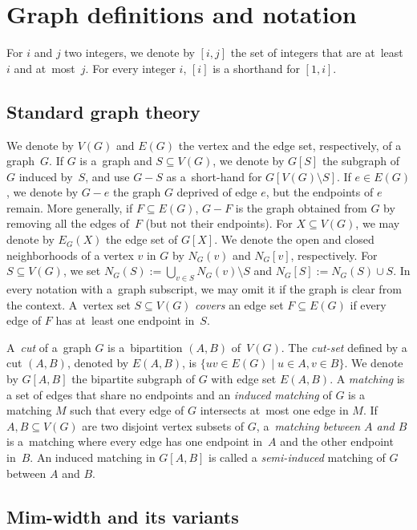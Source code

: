 \documentclass[a4paper,UKenglish,cleveref,hyperref,autoref]{lipics-v2021}
\begin{document}
\section{Graph definitions and notation}

For $i$ and $j$ two integers, we denote by $[i,j]$ the set of integers that are at~least~$i$ and at~most~$j$.
For every integer $i$, $[i]$ is a shorthand for $[1,i]$.

\subsection{Standard graph theory}


We denote by $V(G)$ and $E(G)$ the vertex and the edge set, respectively, of a graph~$G$.
If $G$ is a~graph and $S \subseteq V(G)$, we denote by $G[S]$ the subgraph of $G$ induced by~$S$, and use $G-S$ as a~short-hand for $G[V(G) \setminus S]$.
If $e \in E(G)$, we denote by $G-e$ the graph $G$ deprived of edge $e$, but the endpoints of $e$ remain.
More generally, if $F \subseteq E(G)$, $G-F$ is the graph obtained from $G$ by removing all the edges of~$F$ (but not their endpoints).
For $X \subseteq V(G)$, we may denote by $E_G(X)$ the edge set of $G[X]$.
We denote the open and closed neighborhoods of a vertex $v$ in $G$ by $N_G(v)$ and $N_G[v]$, respectively.
For $S \subseteq V(G)$, we set $N_G(S) := \bigcup_{v \in S}N_G(v) \setminus S$ and $N_G[S] := N_G(S) \cup S$.
In every notation with a~graph subscript, we may omit it if the graph is clear from the context.
A~vertex set $S \subseteq V(G)$ \emph{covers} an edge set $F \subseteq E(G)$ if every edge of $F$ has at~least one endpoint in~$S$. 

A~\emph{cut} of a~graph $G$ is a~bipartition $(A,B)$ of~$V(G)$.
The \emph{cut-set} defined by a cut $(A,B)$, denoted by $E(A,B)$, is $\{uv\in E(G)\mid u\in A, v\in B\}$.
We denote by $G[A,B]$ the bipartite subgraph of $G$ with edge set $E(A,B)$.
A \emph{matching} is a set of edges that share no endpoints
and an \emph{induced matching} of $G$ is a matching $M$ such that every edge of $G$ intersects at~most one edge in $M$.
If $A, B \subseteq V(G)$ are two disjoint vertex subsets of $G$, a~\emph{matching between $A$ and $B$} is a~matching where every edge has one endpoint in~$A$ and the other endpoint in~$B$.
An induced matching in $G[A,B]$ is called a \emph{semi-induced} matching of $G$ between $A$ and $B$.

\subsection{Mim-width and its variants}
\end{document}
